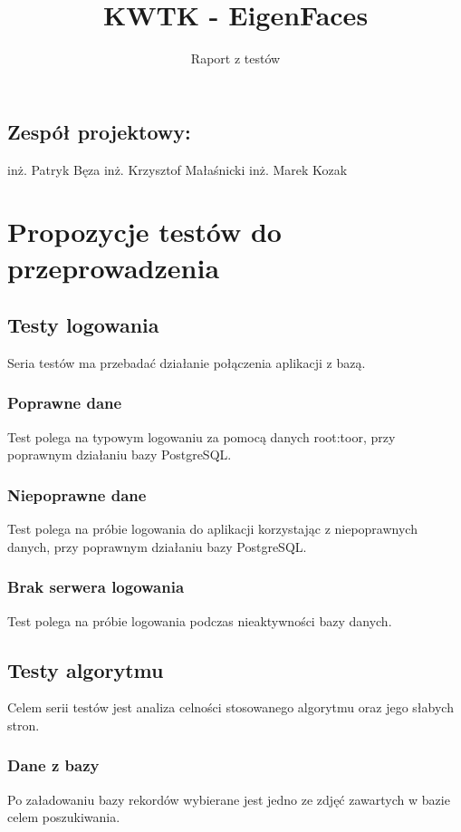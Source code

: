 \documentclass[]{article}
\title{KWTK - EigenFaces}
\author{Raport z testów}
\begin{document}
\maketitle


\subsection*{Zespół projektowy:}
	inż. Patryk Bęza \newline
	inż. Krzysztof Małaśnicki \newline
	inż. Marek Kozak
	
\newpage


\section[Testy]{Propozycje testów do przeprowadzenia}
\label{sec:test}

\subsection{Testy logowania}
Seria testów ma przebadać działanie połączenia aplikacji z bazą.
\subsubsection{Poprawne dane}
Test polega na typowym logowaniu za pomocą danych root:toor, przy poprawnym działaniu bazy PostgreSQL.
\subsubsection{Niepoprawne dane}
Test polega na próbie logowania do aplikacji korzystając z niepoprawnych danych, przy poprawnym działaniu bazy PostgreSQL.
\subsubsection{Brak serwera logowania}
Test polega na próbie logowania podczas nieaktywności bazy danych.

\subsection{Testy algorytmu}
Celem serii testów jest analiza celności stosowanego algorytmu oraz jego słabych stron.
\subsubsection{Dane z bazy}
Po załadowaniu bazy rekordów wybierane jest jedno ze zdjęć zawartych w bazie celem poszukiwania.
\end{document}
